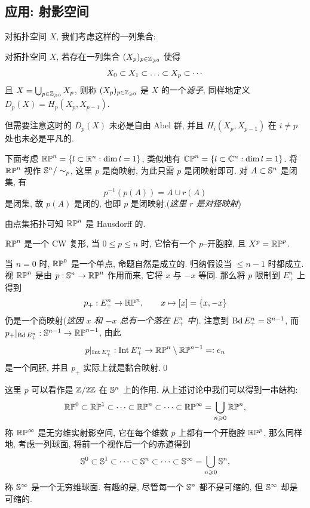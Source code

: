 \subsection{应用: 射影空间}

对拓扑空间 $ X $, 我们考虑这样的一列集合:

\begin{Definition}[滤子]
	对拓扑空间 $ X $, 若存在一列集合 $ (X_p)_{p\in\Zo} $ 使得
	\[
		X_0\subset X_1\subset\dots\susbet X_p\subset\cdots
	\]
	且 $ X=\bigcup_{p\in\Zo}X_p $, 则称 $ (X_p)_{p\in\Zo} $ 是 $ X $ 的一个\emph{滤子}, 同样地定义 $ D_p(X)=H_p(X_p,X_{p-1}) $.
\end{Definition}

但需要注意这时的 $ D_p(X) $ 未必是自由 Abel 群, 并且 $ H_i(X_p,X_{p-1}) $ 在 $ i\ne p $ 处也未必是平凡的.

下面考虑 $ \RP^n=\set{l\subset\R^n : \dim l=1} $, 类似地有 $ \CP^n=\set{l\subset\C^n : \dim l=1} $. 将 $ \RP^n $ 视作 $ \S^n/\sim_p $, 这里 $ p $ 是商映射, 为此只需 $ p $ 是闭映射即可. 对 $ A\subset\S^n $ 是闭集, 有
\[
	p^{-1}(p(A))=A\cup r(A)
\]
是闭集, 故 $ p(A) $ 是闭的, 也即 $ p $ 是闭映射.(\textit{这里 $ r $ 是对径映射})

由点集拓扑可知 $ \RP^n $ 是 Hausdorff 的.

\begin{Proposition}
	$ \RP^n $ 是一个 CW 复形, 当 $ 0\leqslant p\leqslant n $ 时, 它恰有一个 $ p $--开胞腔, 且 $ X^p=\RP^p $.
\end{Proposition}
\begin{Proof}
	当 $ n=0 $ 时, $ \RP^0 $ 是一个单点, 命题自然是成立的. 归纳假设当 $ \leqslant n-1 $ 时都成立. 视 $ \RP^n $ 是由 $ p : \S^n\to\RP^n $ 作用而来, 它将 $ x $ 与 $ -x $ 等同. 那么将 $ p $ 限制到 $ E_+^n $ 上得到
	\[
		p_+ : E_+^n\to\RP^n,\qquad x\mapsto [x]=\set{x,-x}
	\]
	仍是一个商映射(\textit{这因 $ x $ 和 $ -x $ 总有一个落在 $ E_+^n $ 中}). 注意到 $ \Bd E_+^n=\S^{n-1} $, 而 $ p_+|_{\Bd E_+^n} : \S^{n-1}\to\RP^{n-1} $, 由此
	\[
		p|_{\mathrm{Int}\,E_+^n} : \mathrm{Int}\,E_+^n\to\RP^n\sm\RP^{n-1}=:e_n
	\]
	是一个同胚, 并且 $ p_+ $ 实际上就是黏合映射.\qed
\end{Proof}

这里 $ p $ 可以看作是 $ \Z/2\Z $ 在 $ \S^n $ 上的作用. 从上述讨论中我们可以得到一串结构:
\[
	\RP^0\subset\RP^1\subset\cdots\subset\RP^n\susbet\cdots\susbet\RP^\infty=\bigcup_{n\geqslant 0}\RP^n,
\]
称 $ \RP^\infty $ 是无穷维实射影空间, 它在每个维数 $ p $ 上都有一个开胞腔 $ \RP^p $. 那么同样地, 考虑一列球面, 将前一个视作后一个的赤道得到
\[
	\S^0\subset\S^1\subset\cdots\subset\S^n\susbet\cdots\subset\S^\infty=\bigcup_{n\geqslant 0}\S^n,
\]
称 $ \S^\infty $ 是一个无穷维球面. 有趣的是, 尽管每一个 $ \S^n $ 都不是可缩的, 但 $ \S^\infty $ 却是可缩的.

